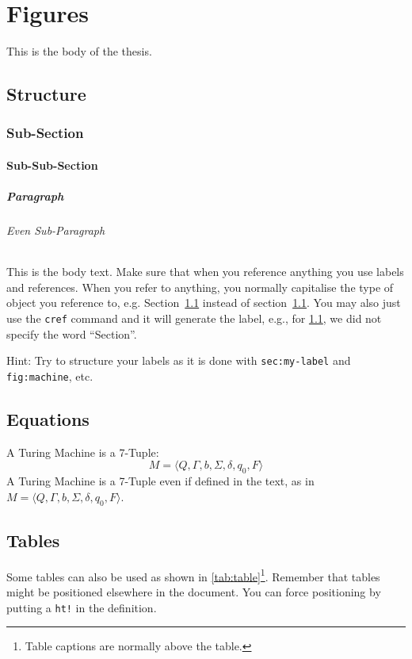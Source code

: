 \chapter{Figures}

This is the body of the thesis.

\section{Structure}
\label{sec:my-label}

\subsection{Sub-Section}

\subsubsection{Sub-Sub-Section}

\paragraph{Paragraph}

\subparagraph{Even Sub-Paragraph}

This is the body text. Make sure that when you reference anything you use labels and references. When you refer to anything, you normally capitalise the type of object you reference to, e.g. Section~\ref{sec:my-label} instead of section~\ref{sec:my-label}. You may also just use the \texttt{cref} command and it will generate the label, e.g., for \cref{sec:my-label}, we did not specify the word ``Section''.

Hint: Try to structure your labels as it is done with \texttt{sec:my-label} and \texttt{fig:machine}, etc.



\section{Equations}
A Turing Machine is a 7-Tuple:
\begin{equation}
    M = \langle Q, \Gamma, b, \Sigma, \delta, q_0, F \rangle
\end{equation}
A Turing Machine is a 7-Tuple even if defined in the text, as in $M = \langle Q, \Gamma, b, \Sigma, \delta, q_0, F \rangle$.




\section{Tables}
Some tables can also be used as shown in \cref{tab:table}\footnote{Table captions are normally above the table.}. Remember that tables might be positioned elsewhere in the document. You can force positioning by putting a \texttt{ht!} in the definition.

